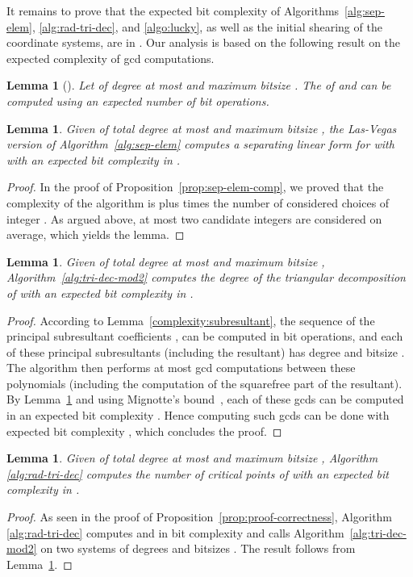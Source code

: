 \documentclass{sig-alternate}
\newtheorem{lemma}[theorem]{Lemma}
\newcommand{\blue}[1]{\color{blue}#1\color{black}\xspace}
\renewcommand{\blue}[1]{#1\xspace}
\begin{document}
It remains to prove that the expected bit complexity of Algorithms~\ref{alg:sep-elem},
\ref{alg:rad-tri-dec}, and \ref{algo:lucky}, as well as the initial \blue{shearing} of
the coordinate systems, are in .
Our analysis is based on the following result on the expected complexity  of gcd computations.


\begin{lemma}[{\cite[Cor. 11.11]{vzGGer2}}]\label{lem:expected-gcd}
Let  of degree at most  and maximum bitsize . The  of  and  can be computed using an expected number of  bit operations.
\end{lemma}


\begin{lemma}\label{lem:sep-elem-comp-exp}
Given   of total degree at most  and maximum bitsize ,
the Las-Vegas version of Algorithm~\ref{alg:sep-elem}  computes a separating linear form  for  with
 with an expected bit complexity in  . 
\end{lemma}
\begin{proof}
  In the proof of Proposition~\ref{prop:sep-elem-comp}, we proved that the complexity of the algorithm
  is  plus  times the number of considered choices of integer . As
  argued above, at most two candidate integers are considered on average, which yields the lemma.
\end{proof}



\begin{lemma}\label{lem:lem:tridec_pair-exp}
Given   of total degree at most  and maximum bitsize ,
Algorithm~\ref{alg:tri-dec-mod2} computes the degree of the triangular decomposition of  
with an expected bit complexity in . 
\end{lemma}
\begin{proof}
According to Lemma~\ref{complexity:subresultant}, the sequence of the principal subresultant
coefficients ,  can be computed in   bit operations,
and each of these principal subresultants (including the resultant) has degree  and bitsize
. The algorithm then performs  at most  gcd computations between these polynomials
(including the computation of the squarefree part of the resultant). By Lemma~\ref{lem:expected-gcd}
and using Mignotte's bound~\cite[Cor. 10.12]{BPR06}, each of these gcds can be computed in  an
expected bit complexity . Hence computing  such
gcds can be done with expected bit complexity , which concludes the proof.
\end{proof}

\begin{lemma}\label{lem:proof-correctness-exp}
Given   of total degree at most  and maximum bitsize ,
  Algorithm \ref{alg:rad-tri-dec} 
computes the number of critical points of  
with an expected bit complexity in . 
\end{lemma}
\begin{proof}
As seen in the proof of Proposition~\ref{prop:proof-correctness}, Algorithm \ref{alg:rad-tri-dec}
computes  and  in bit complexity
 and calls Algorithm~\ref{alg:tri-dec-mod2} on two systems of degrees  and
bitsizes . The result follows from Lemma~\ref{lem:lem:tridec_pair-exp}.
\end{proof}
\end{document}
